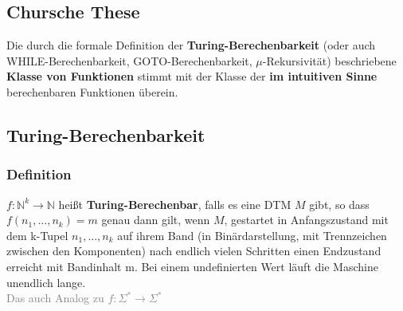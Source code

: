 \documentclass{article}
\begin{document}
		\subsection{Chursche These}
		Die durch die formale Definition der \textbf{Turing-Berechenbarkeit}
		(oder auch WHILE-Berechenbarkeit, GOTO-Berechenbarkeit,
		$\mu$-Rekursivität) beschriebene \textbf{Klasse von Funktionen} stimmt
		mit der Klasse der \textbf{im intuitiven Sinne} berechenbaren
		Funktionen überein.
		\subsection{Turing-Berechenbarkeit}
		\subsubsection{Definition}
		$f: \mathbb{N}^k \rightarrow \mathbb{N}$ heißt \textbf{Turing-Berechenbar}, falls es eine DTM $M$ gibt, so dass $f(n_1,...,n_k) = m$ genau dann gilt, wenn $M$, gestartet in Anfangszustand mit dem k-Tupel $n_1,...,n_k$ auf ihrem Band (in Binärdarstellung, mit Trennzeichen zwischen den Komponenten) nach endlich vielen Schritten einen Endzustand erreicht mit Bandinhalt m. Bei einem undefinierten Wert läuft die Maschine unendlich lange. \\
		\textcolor{gray}{Das auch Analog zu $f: \Sigma^* \rightarrow \Sigma^*$} 
\end{document}

